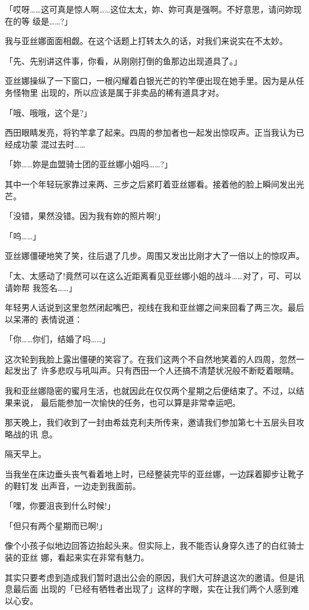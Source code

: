 \documentclass[11pt]{book}
\begin{document}
「哎呀……这可真是惊人啊……这位太太，妳、妳可真是强啊。不好意思，请问妳现在的等
级是……?」

我与亚丝娜面面相觑。在这个话题上打转太久的话，对我们来说实在不太妙。

「先、先别讲这件事，你看，从刚刚打倒的鱼那边出现道具了。」

亚丝娜操纵了一下窗口，一根闪耀着白银光芒的钓竿便出现在她手里。因为是从任务怪物里
出现的，所以应该是属于非卖品的稀有道具才对。

「哦、哦哦，这个是?」

西田眼睛发亮，将钓竿拿了起来。四周的参加者也一起发出惊叹声。正当我认为已经成功蒙
混过去时……

「妳……妳是血盟骑士团的亚丝娜小姐吗……?」

其中一个年轻玩家靠过来两、三步之后紧盯着亚丝娜看。接着他的脸上瞬间发出光芒。

「没错，果然没错。因为我有妳的照片啊!」

「呜……」

亚丝娜僵硬地笑了笑，往后退了几步。周围又发出比刚才大了一倍以上的惊叹声。

「太、太感动了!竟然可以在这么近距离看见亚丝娜小姐的战斗……对了，可、可以请妳帮
我签名……」

年轻男人话说到这里忽然闭起嘴巴，视线在我和亚丝娜之间来回看了两三次。最后以呆滞的
表情说道：

「你……你们，结婚了吗……」

这次轮到我脸上露出僵硬的笑容了。在我们这两个不自然地笑着的人四周，忽然一起发出了
许多悲叹与吼叫声。只有西田一个人还搞不清楚状况般不断眨着眼睛。

我和亚丝娜隐密的蜜月生活，也就因此在仅仅两个星期之后便结束了。不过，以结果来说，
最后能参加一次愉快的任务，也可以算是非常幸运吧。

那天晚上，我们收到了一封由希兹克利夫所传来，邀请我们参加第七十五层头目攻略战的讯
息。

隔天早上。

当我坐在床边垂头丧气看着地上时，已经整装完毕的亚丝娜，一边踩着脚步让靴子的鞋钉发
出声音，一边走到我面前。

「嘿，你要沮丧到什么时候!」

「但只有两个星期而已啊!」

像个小孩子似地边回答边抬起头来。但实际上，我不能否认身穿久违了的白红骑士装的亚丝
娜，看起来实在非常有魅力。

其实只要考虑到造成我们暂时退出公会的原因，我们大可辞退这次的邀请。但是讯息最后面
出现的「已经有牺牲者出现了」这样的字眼，实在让我们两个人感到难以心安。
\end{document}
